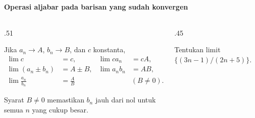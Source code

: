 \documentclass{../../kalkulus-ppt}
\begin{document}
\begin{frame}{\insertsection}
    \framesubtitle{Operasi aljabar pada barisan yang sudah konvergen}
    \begin{columns}[c,onlytextwidth]
        \begin{column}{.51\textwidth}
            \begin{teorema}
                Jika $a_n\to A$, $b_n\to B$, dan $c$ konstanta,
                \[
                    \begin{aligned}
                        \lim c&=c,& \lim ca_n&=cA,\\
                        \lim(a_n\pm b_n)&=A\pm B,&
                        \lim a_nb_n&=AB,\\
                        \lim\frac{a_n}{b_n}&=\frac AB&& (B\ne0).
                    \end{aligned}
                \]
            \end{teorema}
            Syarat $B\ne0$ memastikan $b_n$ jauh dari nol
            untuk semua $n$ yang cukup besar.
        \end{column}
        \begin{column}{.45\textwidth}
            \begin{contoh}
                Tentukan limit $\{(3n-1)/(2n+5)\}$.
            \end{contoh}
        \end{column}
    \end{columns}
\end{frame}
\end{document}
